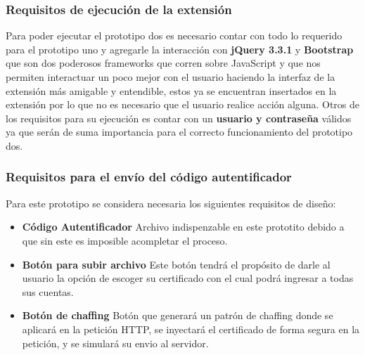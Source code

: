 \documentclass[12pt, a4paper, titlepage]{report}
\begin{document}
			   \subsubsection{Requisitos de ejecución de la extensi\'on}
			        Para poder ejecutar el prototipo dos es necesario contar con todo lo requerido para el prototipo uno y agregarle la interacci\'on con \textbf{jQuery 3.3.1 } y \textbf{Bootstrap} que son dos poderosos frameworks que corren sobre JavaScript y que nos permiten interactuar un poco mejor con el usuario haciendo la interfaz de la extensi\'on más amigable y entendible, estos ya se encuentran insertados en la extensión por lo que no es necesario que el usuario realice acción alguna.
			        Otros de los requisitos para su ejecución es contar con un \textbf{usuario y contraseña} válidos ya que ser\'an de suma importancia para el correcto funcionamiento del prototipo dos.
			     \subsubsection{Requisitos para el envío del código autentificador}   
			        Para este prototipo se considera necesaria los siguientes requisitos de diseño:
			        \begin{itemize}
			            \item \textbf{Código Autentificador} Archivo indispenzable en este prototito debido a que sin este es imposible acompletar el proceso.

			            \item \textbf{Botón para subir archivo} Este botón tendrá el propósito de darle al usuario la opción de escoger su certificado con el cual podrá ingresar a todas sus cuentas.
			            
			            \item \textbf{Botón de chaffing} Botón que generará un patrón de chaffing donde se aplicará en la petición HTTP, se inyectará el certificado de forma segura en la petición, y se simulará su envio al servidor.
			           
			        \end{itemize}
			        
			   
	
\end{document}
